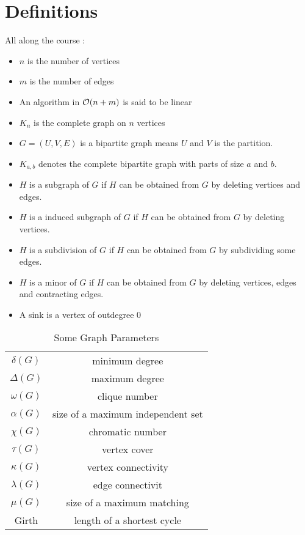 \documentclass{cours}
\begin{document}
\section{Definitions}
All along the course :
\begin{definition}
    \begin{itemize}
        \item $n$ is the number of vertices
        \item $m$ is the number of edges
        \item An algorithm in $\mathcal{O}(n + m)$ is said to be linear
        \item $K_{n}$ is the complete graph on $n$ vertices
        \item $G = \left(U, V, E\right)$ is a bipartite graph means $U$ and $V$ is the partition.
        \item $K_{a, b}$ denotes the complete bipartite graph with parts of size $a$ and $b$.
        \item $H$ is a subgraph of $G$ if $H$ can be obtained from $G$ by deleting vertices and edges.
        \item $H$ is a induced subgraph of $G$ if $H$ can be obtained from $G$ by deleting vertices.
        \item $H$ is a subdivision of $G$ if $H$ can be obtained  from $G$ by subdividing some edges.
        \item $H$ is a minor of $G$ if $H$ can be obtained from $G$ by deleting vertices, edges and contracting edges.
        \item A sink is a vertex of outdegree 0
    \end{itemize}
\end{definition}
\begin{table*}
    \caption{Some Graph Parameters}
    \begin{tabular}{cc}
        $\delta(G)$  & minimum degree                    \\
        $\Delta(G)$  & maximum degree                    \\
        $\omega(G)$  & clique number                     \\
        $\alpha(G)$  & size of a maximum independent set \\
        $\chi(G)$    & chromatic number                  \\
        $\tau(G)$    & vertex cover                      \\
        $\kappa(G)$  & vertex connectivity               \\
        $\lambda(G)$ & edge connectivit                  \\
        $\mu(G)$     & size of a maximum matching        \\
        Girth        & length of a shortest cycle        \\
    \end{tabular}
\end{table*}
\end{document}
